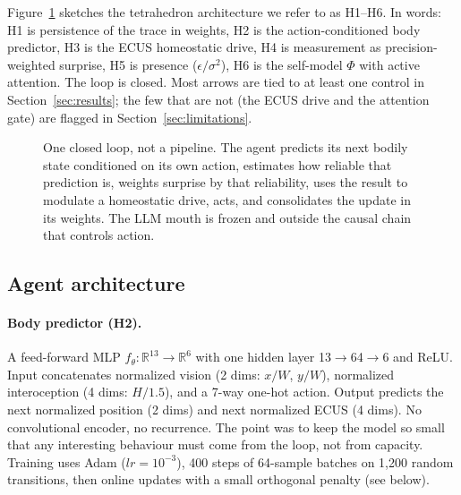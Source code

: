 \documentclass[11pt,a4paper]{article}
\begin{document}
Figure~\ref{fig:tetra} sketches the tetrahedron architecture we refer to as H1--H6. In words: H1 is persistence of the trace in weights, H2 is the action-conditioned body predictor, H3 is the ECUS homeostatic drive, H4 is measurement as precision-weighted surprise, H5 is presence ($\epsilon/\sigma^2$), H6 is the self-model $\Phi$ with active attention. The loop is closed. Most arrows are tied to at least one control in Section~\ref{sec:results}; the few that are not (the ECUS drive and the attention gate) are flagged in Section~\ref{sec:limitations}.

\begin{figure}[h]
\centering
{}
\caption{One closed loop, not a pipeline. The agent predicts its next bodily state conditioned on its own action, estimates how reliable that prediction is, weights surprise by that reliability, uses the result to modulate a homeostatic drive, acts, and consolidates the update in its weights. The LLM mouth is frozen and outside the causal chain that controls action.}
\label{fig:tetra}
\end{figure}

\subsection{Agent architecture}

\paragraph{Body predictor (H2).} A feed-forward MLP $f_\theta: \mathbb{R}^{13} \rightarrow \mathbb{R}^{6}$ with one hidden layer 13$\rightarrow$64$\rightarrow$6 and ReLU. Input concatenates normalized vision (2 dims: $x/W$, $y/W$), normalized interoception (4 dims: $H/1.5$), and a 7-way one-hot action. Output predicts the next normalized position (2 dims) and next normalized ECUS (4 dims). No convolutional encoder, no recurrence. The point was to keep the model so small that any interesting behaviour must come from the loop, not from capacity. Training uses Adam ($lr=10^{-3}$), 400 steps of 64-sample batches on 1,200 random transitions, then online updates with a small orthogonal penalty (see below).
\end{document}
